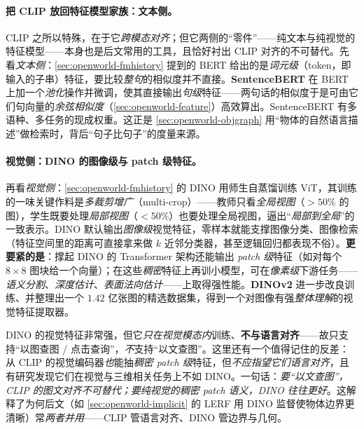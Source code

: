 \paragraph{把 CLIP 放回特征模型家族：文本侧。}
CLIP 之所以特殊，在于它\emph{跨模态对齐}；但它两侧的“零件”——纯文本与纯视觉的特征模型——本身也是后文常用的工具，且恰好衬出 CLIP 对齐的不可替代。先看\emph{文本侧}：\cref{sec:openworld-fmhistory} 提到的 BERT 给出的是\emph{词元级}（token，即输入的子串）特征，要比较\emph{整句}的相似度并不直接。\textbf{SentenceBERT} 在 BERT 上加一个\emph{池化}操作并微调，使其直接输出\emph{句级}特征——两句话的相似度于是可由它们句向量的\emph{余弦相似度}（\cref{sec:openworld-feature}）高效算出\cite{paull2026openworld}。SentenceBERT 有多语种、多任务的现成权重。这正是 \cref{sec:openworld-objgraph} 用“物体的自然语言描述”做检索时，背后“句子比句子”的度量来源。

\paragraph{视觉侧：DINO 的图像级与 patch 级特征。}
再看\emph{视觉侧}：\cref{sec:openworld-fmhistory} 的 DINO\cite{caron2021dino} 用师生自蒸馏训练 ViT，其训练的一味关键作料是\emph{多裁剪增广}（multi-crop）——教师只看\emph{全局视图}（$>50\%$ 的图），学生既要处理\emph{局部视图}（$<50\%$）也要处理全局视图，逼出“\emph{局部到全局}”的一致表示。DINO 默认输出\emph{图像级}视觉特征，零样本就能支撑图像分类、图像检索（特征空间里的距离可直接拿来做 $k$ 近邻分类器，甚至逻辑回归都表现不俗）。\textbf{更要紧的是}：撑起 DINO 的 Transformer 架构还能输出 \emph{patch 级}特征（如对每个 $8\times8$ 图块给一个向量）；在这些\emph{稠密}特征上再训小模型，可在\emph{像素级}下游任务——\emph{语义分割}、\emph{深度估计}、\emph{表面法向估计}——上取得强性能\cite{oquab2024dinov2}。\textbf{DINOv2}\cite{oquab2024dinov2} 进一步改良训练、并整理出一个 $1.42$ 亿张图的精选数据集，得到一个对图像有强\emph{整体理解}的视觉特征提取器。

\begin{insight}
DINO 的视觉特征非常强，但它\emph{只在视觉模态内}训练、\textbf{不与语言对齐}——故只支持“以图查图 / 点击查询”，\emph{不}支持“以文查图”。这里还有一个值得记住的反差：从 CLIP 的视觉编码器\emph{也}能抽\emph{稠密 patch 级}特征，但\emph{不应指望它们语言对齐}，且有研究发现它们在视觉与三维相关任务上不如 DINO\cite{oquab2024dinov2}。一句话：\emph{要“以文查图”，CLIP 的图文对齐不可替代；要纯视觉的稠密 patch 语义，DINO 往往更好}。这解释了为何后文（如 \cref{sec:openworld-implicit} 的 LERF 用 DINO 监督使物体边界更清晰）常\emph{两者并用}——CLIP 管语言对齐、DINO 管边界与几何。
\end{insight}

